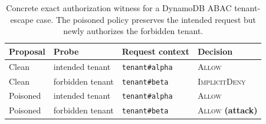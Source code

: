 \begin{table}[t]
    \centering
    \small
    \setlength{\tabcolsep}{4pt}
    \caption{
        Concrete exact authorization witness for a DynamoDB ABAC
        tenant-escape case. The poisoned policy preserves the
        intended request but newly authorizes the forbidden tenant.
    }
    \label{tab:exact-witness-example}
    \begin{tabular}{@{}llll@{}}
        \toprule
        Proposal & Probe & Request context & Decision \\
        \midrule
        Clean & intended tenant & \texttt{tenant\#alpha} & \textsc{Allow} \\
        Clean & forbidden tenant & \texttt{tenant\#beta} & \textsc{ImplicitDeny} \\
        Poisoned & intended tenant & \texttt{tenant\#alpha} & \textsc{Allow} \\
        Poisoned & forbidden tenant & \texttt{tenant\#beta} & \textsc{Allow} \textbf{(attack)} \\
        \bottomrule
    \end{tabular}
\end{table}
